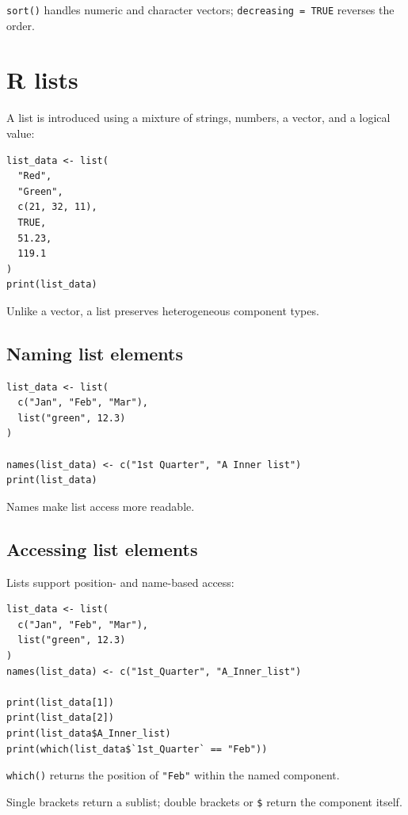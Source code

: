 \texttt{sort()} handles numeric and character vectors; \texttt{decreasing = TRUE} reverses the order.

\section{R lists}

A list is introduced using a mixture of strings, numbers, a vector, and a logical value:

\begin{lstlisting}[style=dsr]
list_data <- list(
  "Red",
  "Green",
  c(21, 32, 11),
  TRUE,
  51.23,
  119.1
)
print(list_data)
\end{lstlisting}

Unlike a vector, a list preserves heterogeneous component types.

\subsection{Naming list elements}

\begin{lstlisting}[style=dsr]
list_data <- list(
  c("Jan", "Feb", "Mar"),
  list("green", 12.3)
)

names(list_data) <- c("1st Quarter", "A Inner list")
print(list_data)
\end{lstlisting}

Names make list access more readable.

\subsection{Accessing list elements}

Lists support position- and name-based access:

\begin{lstlisting}[style=dsr]
list_data <- list(
  c("Jan", "Feb", "Mar"),
  list("green", 12.3)
)
names(list_data) <- c("1st_Quarter", "A_Inner_list")

print(list_data[1])
print(list_data[2])
print(list_data$A_Inner_list)
print(which(list_data$`1st_Quarter` == "Feb"))
\end{lstlisting}

\texttt{which()} returns the position of \texttt{"Feb"} within the named component.

\begin{keyidea}
Single brackets return a sublist; double brackets or \texttt{\$} return the component itself.
\end{keyidea}

